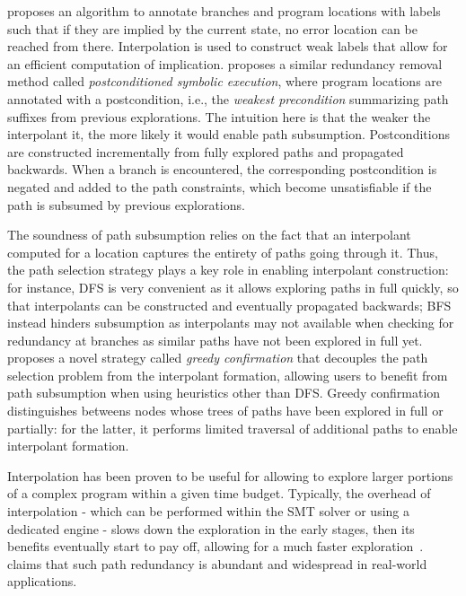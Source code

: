 {\cite{McMillan10} proposes an algorithm to annotate branches and program locations with labels such that if they are implied by the current state, no error location can be reached from there. Interpolation is used to construct weak labels that allow for an efficient computation of implication. \cite{YYG15} proposes a similar redundancy removal method called {\em postconditioned symbolic execution}, where  program locations are annotated with a postcondition, i.e., the {\em weakest precondition} summarizing path suffixes from previous explorations. The intuition here is that the weaker the interpolant it, the more likely it would enable path subsumption. Postconditions are constructed incrementally from fully explored paths and propagated backwards. When a branch is encountered, the corresponding postcondition is negated and added to the path constraints, which become unsatisfiable if the path is subsumed by previous explorations.

The soundness of path subsumption relies on the fact that an interpolant computed for a location captures the entirety of paths going through it. Thus, the path selection strategy plays a key role in enabling interpolant construction: for instance, DFS is very convenient as it allows exploring paths in full quickly, so that interpolants can be constructed and eventually propagated backwards; BFS instead hinders subsumption as interpolants may not available when checking for redundancy at branches as similar paths have not been explored in full yet. \cite{JMN13} proposes a novel strategy called {\em greedy confirmation} that decouples the path selection problem from the interpolant formation, allowing users to benefit from path subsumption when using heuristics other than DFS. Greedy confirmation distinguishes betweens nodes whose trees of paths have been explored in full or partially: for the latter, it performs limited traversal of additional paths to enable interpolant formation.

Interpolation has been proven to be useful for allowing to explore larger portions of a complex program within a given time budget. Typically, the overhead of interpolation - which can be performed within the SMT solver or using a dedicated engine - slows down the exploration in the early stages, then its benefits eventually start to pay off, allowing for a much faster exploration~\cite{JMN13}. \cite{YYG15} claims that such path redundancy is abundant and widespread in real-world applications.

}
